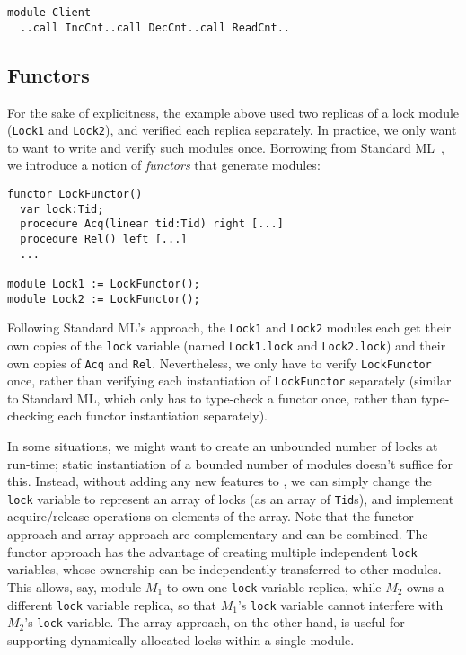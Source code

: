 \begin{verbatim}
module Client
  ..call IncCnt..call DecCnt..call ReadCnt..
\end{verbatim}

\subsection{Functors}

For the sake of explicitness, the example above used two replicas of a lock module
(\verb`Lock1` and \verb`Lock2`),
and verified each replica separately.
In practice, we only want to want to write and verify such modules once.
Borrowing from Standard ML~\cite{StandardML},
we introduce a notion of {\it functors} that generate modules:

\begin{verbatim}
functor LockFunctor()
  var lock:Tid;
  procedure Acq(linear tid:Tid) right [...]
  procedure Rel() left [...]
  ...

module Lock1 := LockFunctor();
module Lock2 := LockFunctor();
\end{verbatim}

Following Standard ML's approach, the \verb`Lock1` and \verb`Lock2` modules each get their own copies of the \verb`lock` variable (named \verb`Lock1.lock` and \verb`Lock2.lock`) and their own copies of \verb`Acq` and \verb`Rel`.
Nevertheless, we only have to verify \verb`LockFunctor` once, rather than verifying each instantiation of \verb`LockFunctor` separately
(similar to Standard ML, which only has to type-check a functor once, rather than type-checking each functor instantiation separately).

In some situations, we might want to create an unbounded number of locks at run-time;
static instantiation of a bounded number of modules doesn't suffice for this.
Instead, without adding any new features to \civl, we can simply change the \verb`lock` variable to represent an array of locks (as an array of \verb`Tid`s),
and implement acquire/release operations on elements of the array.
Note that the functor approach and array approach are complementary and can be combined.
The functor approach has the advantage of creating multiple independent \verb`lock` variables,
whose ownership can be independently transferred to other modules.
This allows, say, module $M_1$ to own one \verb`lock` variable replica,
while $M_2$ owns a different \verb`lock` variable replica,
so that $M_1$'s \verb`lock` variable cannot interfere with $M_2$'s \verb`lock` variable.
The array approach, on the other hand,
is useful for supporting dynamically allocated locks within a single module.

